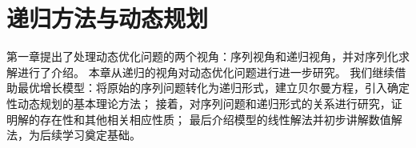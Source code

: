 

\chapter{递归方法与动态规划} \label{ch-dynamic-opt-fe-dp}

第一章提出了处理动态优化问题的两个视角：序列视角和递归视角，并对序列化求解进行了介绍。
本章从递归的视角对动态优化问题进行进一步研究。
我们继续借助最优增长模型：将原始的序列问题转化为递归形式，建立贝尔曼方程，引入确定性动态规划的基本理论方法；
接着，对序列问题和递归形式的关系进行研究，证明解的存在性和其他相关相应性质；
最后介绍模型的线性解法并初步讲解数值解法，为后续学习奠定基础。





















